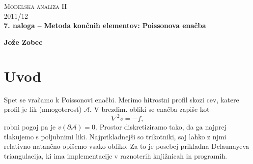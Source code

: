 \documentclass[a4 paper, 12pt]{article}
\begin{document}
\begin{center}
\textsc{Modelska analiza II}\\
\textsc{2011/12}\\[0.5cm]
\textbf{7. naloga -- Metoda kon\v cnih elementov: Poissonova ena\v cba}
\end{center}
\begin{flushright}
\textbf{Jože Zobec}\\
\end{flushright}

\section{Uvod}

Spet se vra\v camo k Poissonovi ena\v cbi. Merimo hitrostni profil skozi cev, katere profil je
lik (mnogoterost) $\mathcal{A}$. V brezdim. obliki se ena\v cba zapi\v se kot
\begin{equation}
	\nabla^2 v = -f,
	\label{poisson}
\end{equation}
robni pogoj pa je $v(\partial \mathcal{A}) = 0$. Prostor diskretiziramo tako, da ga najprej
tlakujemo s poljubnimi liki. Najprikladnej\v si so trikotniki, saj lahko z njmi relativno
natan\v cno opi\v semo vsako obliko. Za to je posebej prikladna Delaunayeva triangulacija, ki
ima implementacije v raznoterih knji\v znicah in programih.
\end{document}
